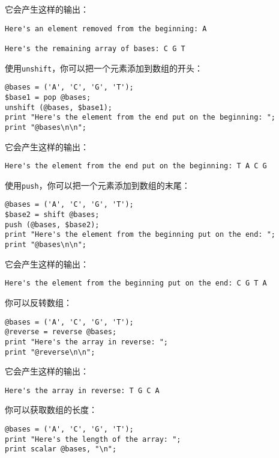 它会产生这样的输出：

\begin{lstlisting}
Here's an element removed from the beginning: A

Here's the remaining array of bases: C G T
\end{lstlisting}

使用\verb|unshift|，你可以把一个元素添加到数组的开头：

\begin{lstlisting}
@bases = ('A', 'C', 'G', 'T');
$base1 = pop @bases;
unshift (@bases, $base1);
print "Here's the element from the end put on the beginning: ";
print "@bases\n\n";
\end{lstlisting}

它会产生这样的输出：

\begin{lstlisting}
Here's the element from the end put on the beginning: T A C G
\end{lstlisting}

使用\verb|push|，你可以把一个元素添加到数组的末尾：

\begin{lstlisting}
@bases = ('A', 'C', 'G', 'T');
$base2 = shift @bases;
push (@bases, $base2);
print "Here's the element from the beginning put on the end: ";
print "@bases\n\n";
\end{lstlisting}

它会产生这样的输出：

\begin{lstlisting}
Here's the element from the beginning put on the end: C G T A
\end{lstlisting}

你可以反转数组：

\begin{lstlisting}
@bases = ('A', 'C', 'G', 'T');
@reverse = reverse @bases;
print "Here's the array in reverse: ";
print "@reverse\n\n";
\end{lstlisting}

它会产生这样的输出：

\begin{lstlisting}
Here's the array in reverse: T G C A
\end{lstlisting}

你可以获取数组的长度：

\begin{lstlisting}
@bases = ('A', 'C', 'G', 'T');
print "Here's the length of the array: ";
print scalar @bases, "\n";
\end{lstlisting}


